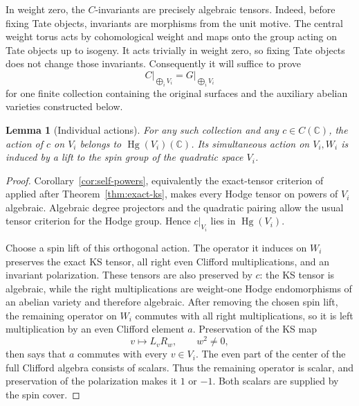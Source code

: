 \documentclass[11pt]{article}
\numberwithin{equation}{section}
\newtheorem{lemma}[theorem]{Lemma}
\theoremstyle{definition}
\theoremstyle{remark}
\begin{document}
In weight zero, the $C$-invariants are precisely algebraic tensors.
Indeed, before fixing Tate objects, invariants are morphisms from the
unit motive.  The central weight torus acts by cohomological weight and
maps onto the group acting on Tate objects up to isogeny.  It acts
trivially in weight zero, so fixing Tate objects does not change those
invariants.  Consequently it will suffice to prove
\begin{equation}\label{eq:mixed-group-goal}
 C\big|_{\bigoplus_i V_i}=G\big|_{\bigoplus_i V_i}
\end{equation}
for one finite collection containing the original surfaces and the
auxiliary abelian varieties constructed below.

\begin{lemma}[Individual actions]\label{lem:mixed-individual}
For any such collection and any $c\in C(\mathbb C)$, the action of $c$ on $V_i$
belongs to $\operatorname{Hg}(V_i)(\mathbb C)$.  Its simultaneous action on $V_i,W_i$ is
induced by a lift to the spin group of the quadratic space $V_i$.
\end{lemma}

\begin{proof}
Corollary~\ref{cor:self-powers}, equivalently the exact-tensor criterion
of \cite[Theorem~1.1]{AKS} applied after
Theorem~\ref{thm:exact-ks}, makes every Hodge tensor on powers of $V_i$
algebraic.  Algebraic degree projectors and the quadratic pairing allow
the usual tensor criterion for the Hodge group.  Hence $c|_{V_i}$ lies
in $\operatorname{Hg}(V_i)$.

Choose a spin lift of this orthogonal action.  The operator it induces
on $W_i$ preserves the exact KS tensor, all right even Clifford
multiplications, and an invariant polarization.  These tensors are
also preserved by $c$: the KS tensor is algebraic, while the right
multiplications are weight-one Hodge endomorphisms of an abelian
variety and therefore algebraic.  After removing the chosen spin lift,
the remaining operator on $W_i$ commutes with all right multiplications,
so it is left multiplication by an even Clifford element $a$.
Preservation of the KS map
\[
 v\longmapsto L_vR_w,\qquad w^2\ne0,
\]
then says that $a$ commutes with every $v\in V_i$.  The even part of
the center of the full Clifford algebra consists of scalars.  Thus the
remaining operator is scalar, and preservation of the polarization
makes it $1$ or $-1$.  Both scalars are supplied by the spin cover.
\end{proof}
\end{document}
